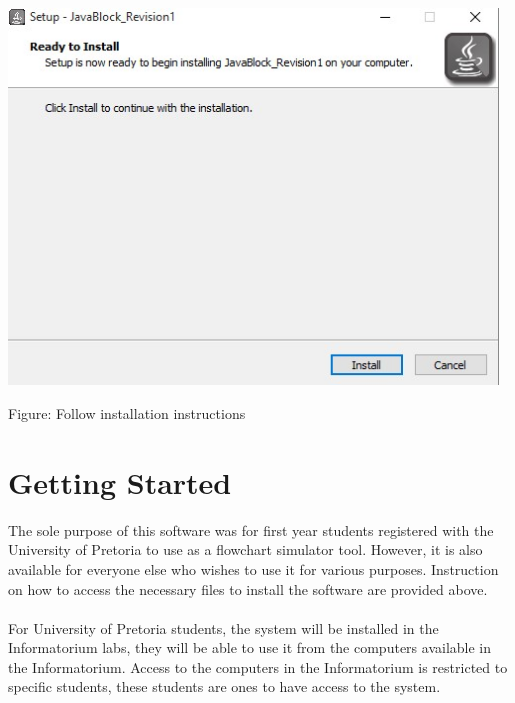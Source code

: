 \documentclass[11pt,a4paper,titlepage]{article}
\begin{document}
		\includegraphics[width=13cm]{images/Install2.jpg}		
		\begin{center}
		Figure: Follow installation instructions
		\end{center}

\section{Getting Started}
	
	
	The sole purpose of this software was for first year students registered with the University of Pretoria to use as a flowchart simulator tool. However, it is also available for everyone else who wishes to use it for various purposes. Instruction on how to access the necessary files to install the software are provided above.\\
	\\For University of Pretoria students, the system will be installed in the Informatorium labs, they will be able to use it from the computers available in the Informatorium. Access to the computers in the Informatorium is restricted to specific students, these students are ones to have access to the system.\\

\end{document}
